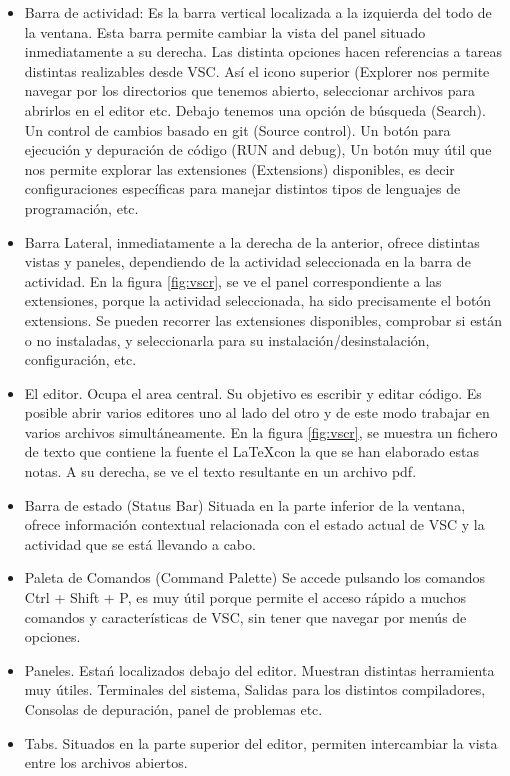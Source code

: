 \begin{itemize}
	\item Barra de actividad: Es la barra vertical localizada a la izquierda del todo de la ventana. Esta barra permite cambiar la vista del panel situado inmediatamente a su derecha. Las distinta opciones hacen referencias a tareas distintas realizables desde VSC. Así el icono superior (Explorer nos permite navegar por los directorios que tenemos abierto, seleccionar archivos para abrirlos en el editor etc. Debajo tenemos una opción de búsqueda (Search). Un control de cambios basado en git (Source control). Un botón para ejecución y depuración de código (RUN and debug), Un botón muy útil que nos permite explorar las extensiones (Extensions) disponibles, es decir configuraciones específicas para manejar distintos tipos de lenguajes de programación, etc.
	\item Barra Lateral, inmediatamente a la derecha de la anterior, ofrece distintas vistas y paneles, dependiendo de la actividad seleccionada en la barra de actividad. En la figura \ref{fig:vscr}, se ve el panel correspondiente a las extensiones, porque la actividad seleccionada, ha sido precisamente el botón extensions. Se pueden recorrer las extensiones disponibles, comprobar si están o no instaladas, y seleccionarla para su instalación/desinstalación, configuración, etc.
	\item El editor. Ocupa el area central. Su objetivo es escribir y editar código. Es posible abrir varios editores uno al lado del otro y de este modo trabajar en varios archivos simultáneamente. En la figura \ref{fig:vscr}, se muestra un fichero de texto que contiene la fuente el \LaTeX con la que se han elaborado estas notas. A su derecha, se ve el texto resultante en un archivo pdf.
	\item Barra de estado (Status Bar) Situada en la parte inferior de la ventana, ofrece información contextual relacionada con el estado actual de VSC y la actividad que se está llevando a cabo.
	\item Paleta de Comandos (Command Palette) Se accede pulsando los comandos Ctrl + Shift + P, es muy útil porque permite el acceso rápido a muchos comandos y características de VSC, sin tener que navegar por menús de opciones.
	\item Paneles. Estań localizados debajo del editor. Muestran distintas herramienta muy útiles. Terminales del sistema, Salidas para los distintos compiladores, Consolas de depuración, panel de problemas etc.
	\item Tabs. Situados en la parte superior del editor, permiten intercambiar la vista entre los archivos abiertos.  
\end{itemize}

